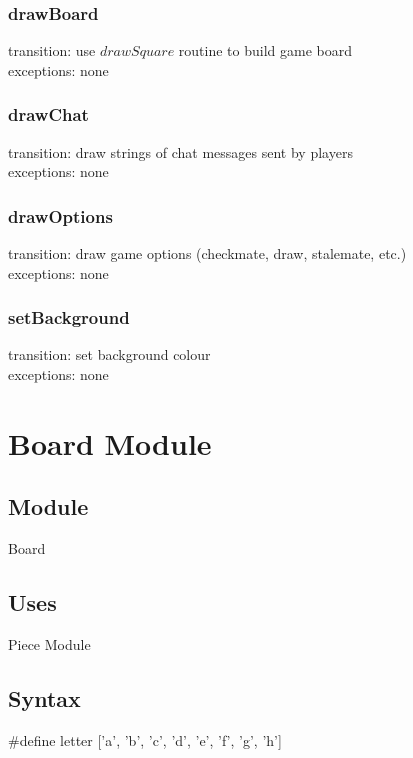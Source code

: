 \documentclass[12pt, titlepage]{article}
\begin{document}
        \subsubsection*{drawBoard}
            transition: use $drawSquare$ routine to build game board \\
            exceptions: none 

        \subsubsection*{drawChat}
            transition: draw strings of chat messages sent by players \\
            exceptions: none 
            
        \subsubsection*{drawOptions}
            transition: draw game options (checkmate, draw, stalemate, etc.) \\
            exceptions: none 

        \subsubsection*{setBackground}
            transition: set background colour \\
            exceptions: none 

\newpage
\section*{Board Module}
    \subsection*{Module}
        Board
    
    \subsection*{Uses}
        Piece Module
    
    \subsection*{Syntax}
        \#define letter ['a', 'b', 'c', 'd', 'e', 'f', 'g', 'h']
        
\end{document}
